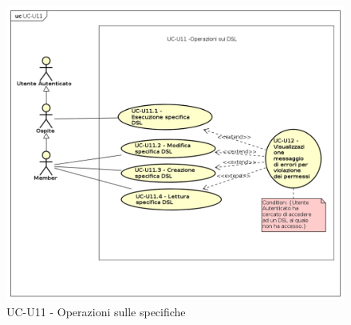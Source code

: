         \begin{figure}[H]
          \begin{center}
            \includegraphics[width=12cm]{res/img/UCUtenti/UCUtenteA/UC-U11-Operazioni DSL/UC-U11.png}
          \caption{UC-U11 - Operazioni sulle specifiche }
          \end{center} 
        \end{figure}
        
